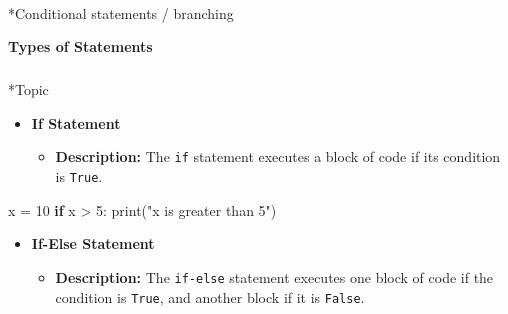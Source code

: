 \documentclass[
  letterpaper,
  DIV=11,
  numbers=noendperiod]{scrreprt}
\makeatletter
\let\oldparagraph\paragraph
\renewcommand{\paragraph}{
    \@ifstar
      \xxxParagraphStar
      \xxxParagraphNoStar
  }
\newcommand{\xxxParagraphStar}[1]{\oldparagraph*{#1}\mbox{}}
\newcommand{\xxxParagraphNoStar}[1]{\oldparagraph{#1}\mbox{}}
\let\oldsubparagraph\subparagraph
\renewcommand{\subparagraph}{
    \@ifstar
      \xxxSubParagraphStar
      \xxxSubParagraphNoStar
  }
\newcommand{\xxxSubParagraphStar}[1]{\oldsubparagraph*{#1}\mbox{}}
\newcommand{\xxxSubParagraphNoStar}[1]{\oldsubparagraph{#1}\mbox{}}
\newenvironment{Shaded}{\begin{snugshade}}{\end{snugshade}}
\newcommand{\BuiltInTok}[1]{\textcolor[rgb]{0.00,0.23,0.31}{#1}}
\newcommand{\ControlFlowTok}[1]{\textcolor[rgb]{0.00,0.23,0.31}{\textbf{#1}}}
\newcommand{\DecValTok}[1]{\textcolor[rgb]{0.68,0.00,0.00}{#1}}
\newcommand{\NormalTok}[1]{\textcolor[rgb]{0.00,0.23,0.31}{#1}}
\newcommand{\OperatorTok}[1]{\textcolor[rgb]{0.37,0.37,0.37}{#1}}
\newcommand{\StringTok}[1]{\textcolor[rgb]{0.13,0.47,0.30}{#1}}
\providecommand{\tightlist}{%
  \setlength{\itemsep}{0pt}\setlength{\parskip}{0pt}}
\makeatother
\begin{document}
\begin{tcolorbox}[enhanced jigsaw, colframe=quarto-callout-note-color-frame, toprule=.15mm, bottomrule=.15mm, rightrule=.15mm, colback=white, breakable, arc=.35mm, opacityback=0, left=2mm, leftrule=.75mm]
\end{tcolorbox}

\paragraph*{Conditional statements /
branching}\label{conditional-statements-branching}

\begin{tcolorbox}[enhanced jigsaw, colframe=quarto-callout-note-color-frame, toprule=.15mm, bottomrule=.15mm, rightrule=.15mm, colback=white, breakable, arc=.35mm, opacityback=0, left=2mm, leftrule=.75mm]

\vspace{-3mm}\textbf{Types of Statements}\vspace{3mm}

\subparagraph*{Topic}\label{topic-1}

\begin{itemize}
\item
  \textbf{If Statement}

  \begin{itemize}
  \tightlist
  \item
    \textbf{Description:} The \texttt{if} statement executes a block of
    code if its condition is \texttt{True}.
  \end{itemize}
\end{itemize}

\begin{Shaded}
\begin{Highlighting}[]
\NormalTok{x }\OperatorTok{=} \DecValTok{10}
\ControlFlowTok{if}\NormalTok{ x }\OperatorTok{\textgreater{}} \DecValTok{5}\NormalTok{:}
    \BuiltInTok{print}\NormalTok{(}\StringTok{"x is greater than 5"}\NormalTok{)}
\end{Highlighting}
\end{Shaded}

\begin{itemize}
\item
  \textbf{If-Else Statement}

  \begin{itemize}
  \tightlist
  \item
    \textbf{Description:} The \texttt{if-else} statement executes one
    block of code if the condition is \texttt{True}, and another block
    if it is \texttt{False}.
  \end{itemize}
\end{itemize}


\end{tcolorbox}
\end{document}
